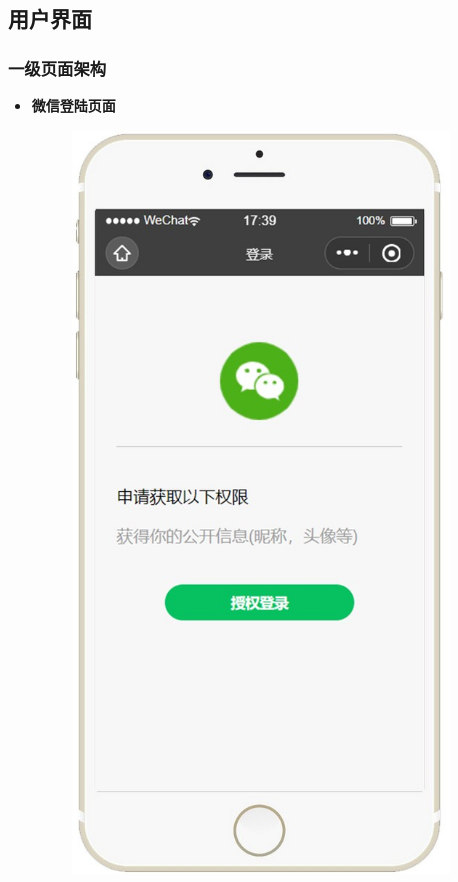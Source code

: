 \documentclass[UTF8,12pt]{ctexart}
\numberwithin{figure}{section}%
\begin{document}
\begin{spacing}{2}
\subsection{用户界面}

\subsubsection{一级页面架构}

\begin{itemize}	
	
	
	\newpage
	\item\textbf{微信登陆页面}
	
	\begin{figure}[!htb]
		\centering
		\includegraphics[width=10cm]{fig/!14}
	\end{figure}
	

\end{itemize}
\end{spacing}
\end{document}
